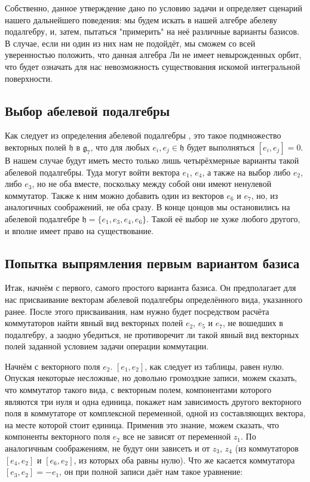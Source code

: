 \documentclass[a4paper]{article}
\begin{document}
Собственно, данное утверждение дано по условию задачи и определяет сценарий нашего дальнейшего поведения: мы будем искать в нашей алгебре абелеву подалгебру, и, затем, пытаться "примерить" на неё различные варианты базисов. В случае, если ни один из них нам не подойдёт, мы сможем со всей уверенностью положить, что данная алгебра Ли не имеет невырожденных орбит, что будет означать для нас невозможность существования искомой интегральной поверхности.

\subsection{Выбор абелевой подалгебры}
Как следует из определения абелевой подалгебры \cite[с.~131]{Shewalie}, это такое подмножество векторных полей $\mathfrak{h}$ в $\mathfrak{g}_{7}$, что для любых $e_{i}, e_{j} \in \mathfrak{h}$ будет выполняться $[e_{i}, e_{j}]=0$. В нашем случае будут иметь место только лишь четырёхмерные варианты такой абелевой подалгебры. Туда могут войти вектора $e_{1}$, $e_{4}$, а также на выбор либо $e_{2}$, либо $e_{3}$, но не оба вместе, поскольку между собой они имеют ненулевой коммутатор. Также к ним можно добавить один из векторов $e_{6}$ и $e_{7}$, но, из аналогичных соображений, не оба сразу. В конце цонцов мы остановились на абелевой подалгебре $\mathfrak{h}=\{e_{1}, e_{3}, e_{4}, e_{6}\}$. Такой её выбор не хуже любого другого, и вполне имеет право на существование.

\subsection{Попытка выпрямления первым вариантом базиса}
Итак, начнём с первого, самого простого варианта базиса. Он предполагает для нас присваивание векторам абелевой подалгебры определённого вида, указанного ранее. После этого присваивания, нам нужно будет посредством расчёта коммутаторов найти явный вид векторных полей $e_{2}$, $e_{5}$ и $e_{7}$, не вошедших в подалгебру, а заодно убедиться, не противоречит ли такой явный вид векторных полей заданной условием задачи операции коммутации.

Начнём с векторного поля $e_{2}$. $[e_{1}, e_{2}]$, как следует из таблицы, равен нулю. Опуская некоторые несложные, но довольно громоздкие записи, можем сказать, что коммутатор такого вида, с векторным полем, компонентами которого являются три нуля и одна единица, покажет нам зависимость другого векторного поля в коммутаторе от комплексной переменной, одной из составляющих вектора, на месте которой стоит единица. Применив это знание, можем сказать, что компоненты векторного поля $e_{2}$ все не зависят от переменной $z_{1}$. По аналогичным соображениям, не будут они зависеть и от $z_{3}$, $z_{4}$ (из коммутаторов $[e_{4}, e_{2}]$ и $[e_{6}, e_{2}]$, из которых оба равны нулю). Что же касается коммутатора $[e_{3}, e_{2}] = -e_{1}$, он при полной записи даёт нам такое уравнение:
\end{document}
